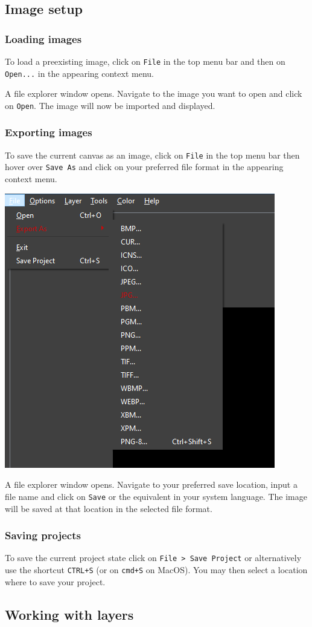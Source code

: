 \documentclass[a4paper, 12pt]{article}
\begin{document}
\subsection{Image setup}
\subsubsection{Loading images}
To load a preexisting image, click on \texttt{File} in the top menu bar and then on \texttt{Open...} in the appearing context menu.

A file explorer window opens. Navigate to the image you want to open and click on \texttt{Open}. The image will now be imported and displayed.

\subsubsection{Exporting images}
To save the current canvas as an image, click on \texttt{File} in the top menu bar then hover over \texttt{Save As} and click on your preferred file format in the appearing context menu.
\begin{center}
\includegraphics[width=0.3\linewidth,keepaspectratio]{assets/file-save}
\end{center}

A file explorer window opens. Navigate to your preferred save location, input a file name and click on \texttt{Save} or the equivalent in your system language. The image will be saved at that location in the selected file format.

\subsubsection{Saving projects}
To save the current project state click on \texttt{File > Save Project} or alternatively use the shortcut \texttt{CTRL+S} (or on \texttt{cmd+S} on MacOS). You may then select a location where to save your project.

\subsection{Working with layers}
\end{document}
